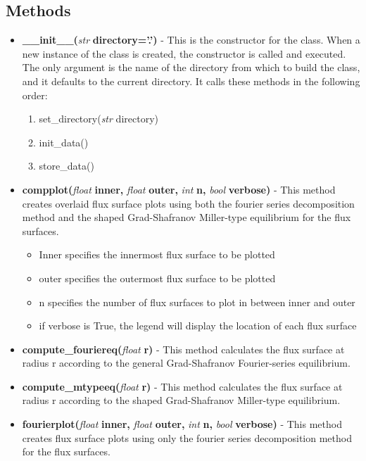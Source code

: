 \documentclass{article}
\begin{document}
\subsection{Methods}
\begin{itemize}
\item \textbf{\_\_init\_\_(}\emph{str}\textbf{ directory='.')} - This is the constructor for the class.  When a new instance of the class is created, the constructor is called and executed.  The only argument is the name of the directory from which to build the class, and it defaults to the current directory.  It calls these methods in the following order:
\begin{enumerate}
\item set\_directory(\emph{str} directory)
\item init\_data()
\item store\_data()
\end{enumerate}
\item \textbf{compplot(}\emph{float}\textbf{ inner, }\emph{float}\textbf{ outer, }\emph{int}\textbf{ n, }\emph{bool}\textbf{ verbose)} - This method creates overlaid flux surface plots using both the fourier series decomposition method and the shaped Grad-Shafranov Miller-type equilibrium for the flux surfaces.
\begin{itemize}
\item Inner specifies the innermost flux surface to be plotted
\item outer specifies the outermost flux surface to be plotted
\item n specifies the number of flux surfaces to plot in between inner and outer
\item if verbose is True, the legend will display the location of each flux surface
\end{itemize}
\item \textbf{compute\_fouriereq(}\emph{float}\textbf{ r)} - This method calculates the flux surface at radius r according to the general Grad-Shafranov Fourier-series equilibrium.
\item \textbf{compute\_mtypeeq(}\emph{float}\textbf{ r)} - This method calculates the flux surface at radius r according to the shaped Grad-Shafranov Miller-type equilibrium.
\item \textbf{fourierplot(}\emph{float}\textbf{ inner, }\emph{float}\textbf{ outer, }\emph{int}\textbf{ n, }\emph{bool}\textbf{ verbose)} - This method creates flux surface plots using only the fourier series decomposition method for the flux surfaces.
\begin{itemize}

\end{itemize}
\end{itemize}
\end{document}
